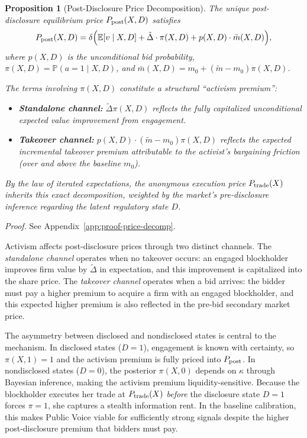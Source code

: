 \documentclass[11pt]{article}
\newtheorem{proposition}{Proposition}
\newcommand{\E}{\mathbb{E}}
\newcommand{\PP}{\mathbb{P}}
\newcommand{\1}{\mathbf{1}}
\begin{document}
\begin{proposition}[Post-Disclosure Price Decomposition]
\label{prop:price-decomp}
The unique post-disclosure equilibrium price $P_{\textup{post}}(X,D)$ satisfies
\[
P_{\textup{post}}(X,D) = \delta\Big(\E[v \mid X,D] + \tilde{\Delta} \cdot \pi(X,D) + p(X,D) \cdot \bar{m}(X,D)\Big),
\]
where $p(X,D)$ is the unconditional bid probability, $\pi(X,D) = \PP(a=1 \mid X,D)$, and $\bar{m}(X,D) = m_0 + (\tilde{m} - m_0)\pi(X,D)$.

The terms involving $\pi(X,D)$ constitute a structural ``activism premium'':
\begin{itemize}[leftmargin=1.5em,itemsep=0pt]
\item \textbf{Standalone channel:} $\tilde{\Delta}\pi(X,D)$ reflects the fully capitalized unconditional expected value improvement from engagement.
\item \textbf{Takeover channel:} $p(X,D) \cdot (\tilde{m}-m_0)\pi(X,D)$ reflects the expected \emph{incremental} takeover premium attributable to the activist's bargaining friction (over and above the baseline $m_0$).
\end{itemize}
By the law of iterated expectations, the anonymous execution price $P_{\textup{trade}}(X)$ inherits this exact decomposition, weighted by the market's pre-disclosure inference regarding the latent regulatory state $D$.
\end{proposition}
\textit{Proof.} See Appendix~\ref{app:proof-price-decomp}.

Activism affects post-disclosure prices through two distinct channels. The \emph{standalone channel} operates when no takeover occurs: an engaged blockholder improves firm value by $\tilde{\Delta}$ in expectation, and this improvement is capitalized into the share price. The \emph{takeover channel} operates when a bid arrives: the bidder must pay a higher premium to acquire a firm with an engaged blockholder, and this expected higher premium is also reflected in the pre-bid secondary market price.

The asymmetry between disclosed and nondisclosed states is central to the mechanism. In disclosed states ($D=1$), engagement is known with certainty, so $\pi(X,1)=1$ and the activism premium is fully priced into $P_{\textup{post}}$. In nondisclosed states ($D=0$), the posterior $\pi(X,0)$ depends on $\kappa$ through Bayesian inference, making the activism premium liquidity-sensitive. Because the blockholder executes her trade at $P_{\textup{trade}}(X)$ \emph{before} the disclosure state $D=1$ forces $\pi=1$, she captures a stealth information rent. In the baseline calibration, this makes Public Voice viable for sufficiently strong signals despite the higher post-disclosure premium that bidders must pay.
\end{document}
